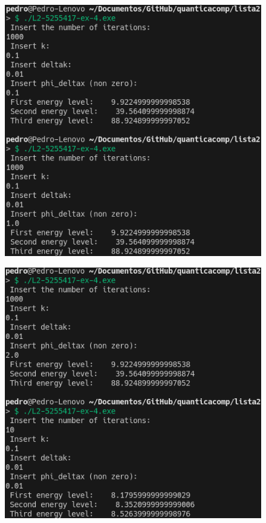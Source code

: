 \documentclass[12pt, a4paper]{article} %
\begin{document}
        \begin{figure}[H]    
            \centering
            \includegraphics[scale=0.5]{../images/results-ex4-5.png}
            \caption{}
        \end{figure}
        \begin{figure}[H]    
            \centering
            \includegraphics[scale=0.5]{../images/results-ex4-6.png}
            \caption{}
        \end{figure}
\end{document}
